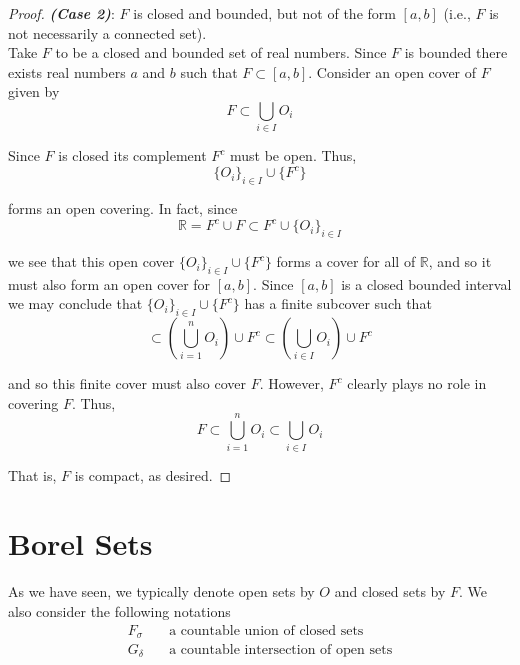 \documentclass[12pt]{article}
\newlength\tindent
\renewcommand{\indent}{\hspace*{\tindent}}
\newcommand{\R}{\mathbb R}
\begin{document}
\begin{proof}

{\bf \em (Case 2)}: $F$ is closed and bounded, but not of the form $[a,b]$ (i.e., $F$ is not necessarily a connected set). \\

\indent Take $F$ to be a closed and bounded set of real numbers. Since $F$ is bounded there exists real numbers $a$ and $b$ such that $F \subset [a,b]$. Consider an open cover of $F$ given by
\begin{equation*}
	F \subset \bigcup_{i \in I} O_i
\end{equation*}

Since $F$ is closed its complement $F^c$ must be open. Thus,
\begin{equation*}
	\{ O_i \}_{i \in I} \cup \{F^c\}
\end{equation*}

forms an open covering. In fact, since
\begin{equation*}
	\R = F^c \cup F \subset F^c \cup \{O_i\}_{i \in I}
\end{equation*}

we see that this open cover $\{ O_i \}_{i \in I} \cup \{F^c\}$ forms a cover for all of $\R$, and so it must also form an open cover for $[a,b]$. Since $[a,b]$ is a closed bounded interval we may conclude that $\{ O_i \}_{i \in I} \cup \{F^c\}$ has a finite subcover such that
\begin{equation*}
	[a,b] \subset \left( \bigcup^n_{i = 1} O_i \right) \cup F^c \subset \left( \bigcup_{i \in I} O_i \right) \cup F^c
\end{equation*}

and so this finite cover must also cover $F$. However, $F^c$ clearly plays no role in covering $F$. Thus,
\begin{equation*}
	F \subset \bigcup^n_{i = 1} O_i \subset \bigcup_{i\in I} O_i
\end{equation*}

That is, $F$ is compact, as desired.
\end{proof}

\section{Borel Sets}

\indent As we have seen, we typically denote open sets by $O$ and closed sets by $F$. We also consider the following notations
\begin{align*}
	F_\sigma &\quad \text{a countable union of closed sets} \\
	G_\delta &\quad \text{a countable intersection of open sets}
\end{align*}
\end{document}
